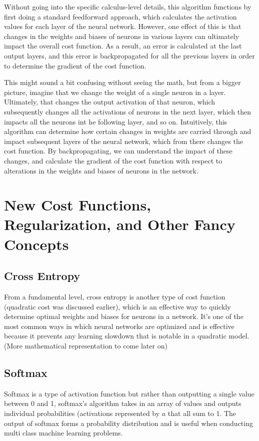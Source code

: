 \documentclass[11pt]{article}
\theoremstyle{definition}
\begin{document}
Without going into the specific calculus-level details, this algorithm functions by first doing a standard feedforward approach, which calculates the activation values for each layer of the neural network. However, one effect of this is that changes in the weights and biases of neurons in various layers can ultimately impact the overall cost function. As a result, an error is calculated at the last output layers, and this error is backpropagated for all the previous layers in order to determine the gradient of the cost function.

This might sound a bit confusing without seeing the math, but from a bigger picture, imagine that we change the weight of a single neuron in a layer. Ultimately, that changes the output activation of that neuron, which subsequently changes all the activations of neurons in the next layer, which then impacts all the neurons int he following layer, and so on. Intuitively, this algorithm can determine how certain changes in weights are carried through and impact subsequent layers of the neural network, which from there changes the cost function. By backpropagating, we can understand the impact of these changes, and calculate the gradient of the cost function with respect to alterations in the weights and biases of neurons in the network. 

\section{New Cost Functions, Regularization, and Other Fancy Concepts}
\subsection{Cross Entropy}
From a fundamental level, cross entropy is another type of cost function (quadratic cost was discussed earlier), which is an effective way to quickly determine optimal weights and biases for neurons in a network. It's one of the most common ways in which neural networks are optimized and is effective because it prevents any learning slowdown that is notable in a quadratic model. (More mathematical representation to come later on)

\subsection{Softmax}
Softmax is a type of activation function but rather than outputting a single value between 0 and 1, softmax's algorithm takes in an array of values and outputs individual probabilities (activations represented by \(a\) that all sum to 1. The output of softmax forms a probability distribution and is useful when conducting multi class machine learning problems.
\end{document}
